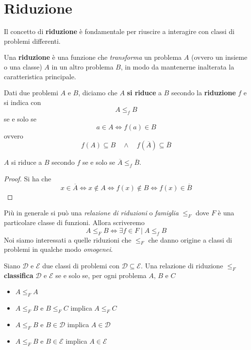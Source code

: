 \section{Riduzione}
Il concetto di \textbf{riduzione} è fondamentale per riuscire
a interagire con classi di problemi differenti.

Una \textbf{riduzione} è una funzione che \emph{transforma}
un problema $A$ (ovvero un insieme o una classe) $A$ in un
altro problema $B$, in modo da mantenerne inalterata la
caratteristica principale.

\begin{definition}
	Dati due problemi $A$ e $B$, diciamo che $A$ \textbf{si riduce}
	a $B$ secondo la \textbf{riduzione} $f$ e si indica con
	\[ A \leq_f B \]
	se e solo se
	\[ a \in A \iff f(a) \in B \]
	ovvero
	\[
		f(A) \subseteq B \quad \land
		\quad f(\overline{A}) \subseteq \overline{B}
	\]
\end{definition}

\begin{property}
	$A$ si riduce a $B$ secondo $f$ se e solo se
	$\overline{A} \leq_f \overline{B}$.
	\begin{proof}
		Si ha che
		\[
			x \in \overline{A} \iff x \notin A \iff
			f(x) \notin B \iff f(x) \in \overline{B}
		\]
	\end{proof}
\end{property}

Più in generale si può una \emph{relazione di riduzioni} o
\emph{famiglia} $\leq_F$ dove $F$ è una particolare classe di
funzioni. Allora scriveremo
\[ A \leq_F B \iff \exists f \in F \mid A \leq_f B \]
Noi siamo interessati a quelle riduzioni che $\leq_F$ che danno
origine a classi di problemi in qualche modo \emph{omogenei}.

\begin{definition}
	Siano $\mathcal{D}$ e $\mathcal{E}$ due classi di problemi
	con $\mathcal{D} \subseteq \mathcal{E}$. Una relazione di
	riduzione $\leq_F$ \textbf{classifica} $\mathcal{D}$ e
	$\mathcal{E}$ se e solo se, per ogni problema $A$, $B$ e $C$
	\begin{itemize}
		\item $A \leq_F A$
		\item $A \leq_F B$ e $B \leq_F C$ implica $A \leq_F C$
		\item $A \leq_F B$ e $B \in \mathcal{D}$ implica
		      $A \in \mathcal{D}$
		\item $A \leq_F B$ e $B \in \mathcal{E}$ implica
		      $A \in \mathcal{E}$
	\end{itemize}
\end{definition}

